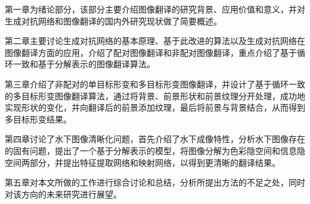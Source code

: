 第一章为绪论部分，该部分主要介绍图像翻译的研究背景、应用价值和意义，并对生成对抗网络和图像翻译的国内外研究现状做了简要概述。

第二章主要讨论生成对抗网络的基本原理、基于此改进的算法以及生成对抗网络在图像翻译方面的应用，介绍了配对图像翻译和非配对图像翻译，重点介绍了基于循环一致和基于分解表示的图像翻译算法。

第三章介绍了非配对的单目标形变和多目标形变图像翻译，并设计了基于循环一致的多目标形变图像翻译算法，通过将背景、前景形状和前景纹理分开处理，成功地实现形状的变化，并向翻译后的前景添加纹理，最后将前景与背景结合，从而得到多目标形变结果。

第四章讨论了水下图像清晰化问题，首先介绍了水下成像特性，分析水下图像存在的固有问题，提出了一个基于分解表示的模型，将图像分解为色彩隐空间和信息隐空间两部分，并提出特征提取网络和映射网络，以得到更清晰的翻译结果。

第五章对本文所做的工作进行综合讨论和总结，分析所提出方法的不足之处，同时对该方向的未来研究进行展望。
